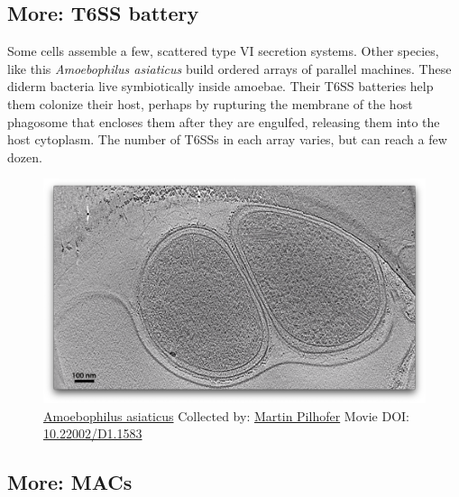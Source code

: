 \documentclass[]{tufte-book}
\begin{document}
\hypertarget{T6SS_battery}{\subsection*{More: T6SS
battery}\label{T6SS_battery}}

Some cells assemble a few, scattered type VI secretion systems. Other
species, like this \emph{Amoebophilus asiaticus} build ordered arrays of
parallel machines. These diderm bacteria live symbiotically inside
amoebae. Their T6SS batteries help them colonize their host, perhaps by
rupturing the membrane of the host phagosome that encloses them after
they are engulfed, releasing them into the host cytoplasm. The number of
T6SSs in each array varies, but can reach a few dozen.





\begin{figure}
\includegraphics{movie_stills/9_7a} \caption[\protect\hyperlink{tree}{Amoebophilus asiaticus} Collected
by: \protect\hyperlink{martin_pilhofer}{Martin Pilhofer} Movie DOI:
\href{https://doi.org/10.22002/D1.1583}{10.22002/D1.1583}]{\protect\hyperlink{tree}{Amoebophilus asiaticus} Collected
by: \protect\hyperlink{martin_pilhofer}{Martin Pilhofer} Movie DOI:
\href{https://doi.org/10.22002/D1.1583}{10.22002/D1.1583}}\label{fig:9-7a}
\end{figure}

\hypertarget{MACs}{\subsection*{More: MACs}\label{MACs}}
\end{document}
